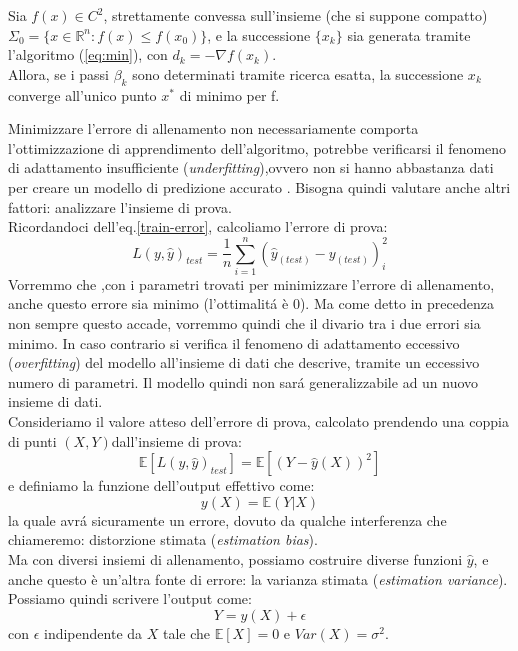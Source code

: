 \documentclass[a4paper,12pt,oneside]{book}
\begin{document}
\begin{teo}
Sia $f(x)\in C^{2}$, strettamente convessa sull'insieme (che si suppone compatto) $\Sigma_{0}=\{x\in\mathbb{R}^{n}:f(x)\leq f(x_{0})\}$, e la successione $\{x_{k}\}$ sia generata tramite l'algoritmo (\ref{eq:min}), con $d_{k}=-\nabla f(x_{k})$.\\
Allora, se i passi $\beta_{k}$ sono determinati tramite ricerca esatta, la successione $x_{k}$ converge all'unico punto $x^{*}$ di minimo per f.
\end{teo}
Minimizzare l'errore di allenamento non necessariamente comporta l'ottimizzazione di apprendimento dell'algoritmo, potrebbe verificarsi il fenomeno di adattamento insufficiente (\textit{underfitting}),ovvero non si hanno abbastanza dati per creare un modello di predizione accurato . Bisogna quindi valutare anche altri fattori: analizzare l'insieme di prova.\\
Ricordandoci dell'eq.\ref{train-error}, calcoliamo l'errore di prova:
\begin{equation}\label{test-error}
L(y,\hat{y})_{test}=\frac{1}{n}\sum_{i=1}^{n}(\hat{y}_{(test)}-y_{(test)})_{i}^2
\end{equation}
Vorremmo che ,con i parametri trovati per minimizzare l'errore di allenamento, anche questo errore sia minimo (l'ottimalit\'{a} \`e 0). Ma come detto in precedenza non sempre questo accade, vorremmo quindi che il divario tra i due errori sia minimo. In caso contrario si verifica il fenomeno di adattamento eccessivo (\textit{overfitting}) del modello all'insieme di dati che descrive, tramite un eccessivo numero di parametri. Il modello quindi non sar\'{a} generalizzabile ad un nuovo insieme di dati.\\
Consideriamo il valore atteso dell'errore di prova, calcolato prendendo una coppia di punti $(X,Y)$dall'insieme di prova:
\begin{equation}\label{test}
\mathbb{E} [L(y,\hat{y})_{test}]=\mathbb{E} [(Y-\hat{y}(X))^{2}]
\end{equation}
e definiamo la funzione dell'output effettivo come:
$$y(X)=\mathbb{E}(Y|X)$$
la quale avr\'{a} sicuramente un errore, dovuto da qualche interferenza che chiameremo: distorzione stimata (\textit{estimation bias}).\\
Ma con diversi insiemi di allenamento, possiamo costruire diverse funzioni $\hat{y}$, e anche questo \`e un'altra fonte di errore: la varianza stimata (\textit{estimation variance}). Possiamo quindi scrivere l'output come:
$$Y=y(X)+\epsilon$$ con $\epsilon$ indipendente da $X$ tale che $\mathbb{E}[X]=0$ e $Var(X)=\sigma^{2}$.\\
\end{document}
